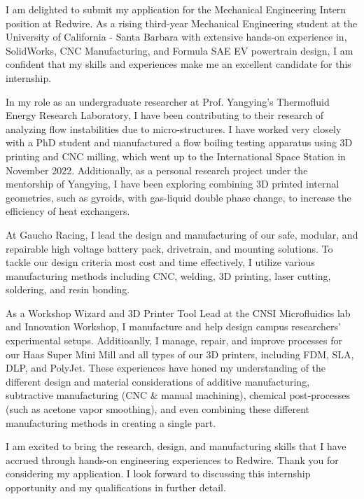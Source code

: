 \documentclass[11pt, letterpaper]{awesome-cv} %
\begin{document}
\makecvheader %

\makelettertitle %


\begin{cvletter}


I am delighted to submit my application for the Mechanical Engineering Intern position at Redwire. As a rising third-year Mechanical Engineering student at the University of California - Santa Barbara with extensive hands-on experience in, SolidWorks, CNC Manufacturing, and Formula SAE EV powertrain design,  I am confident that my skills and experiences make me an excellent candidate for this internship.

In my role as an undergraduate researcher at Prof. Yangying's Thermofluid Energy Research Laboratory, I have been contributing to their research of analyzing flow instabilities due to micro-structures. I have worked very closely with a PhD student and manufactured a flow boiling testing apparatus using 3D printing and CNC milling, which went up to the International Space Station in November 2022. Additionally, as a personal research project under the mentorship of Yangying, I have been exploring combining 3D printed internal geometries, such as gyroids, with gas-liquid double phase change, to increase the efficiency of heat exchangers. 

At Gaucho Racing, I lead the design and manufacturing of our safe, modular, and repairable high voltage battery pack, drivetrain, and mounting solutions. To tackle our design criteria most cost and time effectively, I utilize various manufacturing methods including CNC, welding, 3D printing, laser cutting, soldering, and resin bonding. 

As a Workshop Wizard and 3D Printer Tool Lead at the CNSI Microfluidics lab and Innovation Workshop, I manufacture and help design campus researchers' experimental setups. Additioanlly, I manage, repair, and improve processes for our Haas Super Mini Mill and all types of our 3D printers, including FDM, SLA, DLP, and PolyJet. These experiences have honed my understanding of the different design and material considerations of additive manufacturing, subtractive manufacturing (CNC \& manual machining), chemical post-processes (such as acetone vapor smoothing), and even combining these different manufacturing methods in creating a single part.

I am excited to bring the research, design, and manufacturing skills that I have accrued through hands-on engineering experiences to Redwire. Thank you for considering my application. I look forward to discussing this internship opportunity and my qualifications in further detail.


\end{cvletter}


\makeletterclosing %
\end{document}
